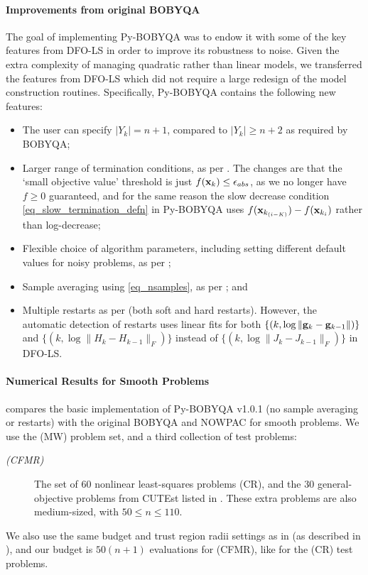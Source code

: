 \paragraph{Improvements from original BOBYQA}
The goal of implementing Py-BOBYQA was to endow it with some of the key features from DFO-LS in order to improve its robustness to noise.
Given the extra complexity of managing quadratic rather than linear models, we transferred the features from DFO-LS which did not require a large redesign of the model construction routines.
Specifically, Py-BOBYQA contains the following new features:
\begin{itemize}
	\item The user can specify $|Y_k|=n+1$, compared to $|Y_k|\geq n+2$ as required by BOBYQA;
	\item Larger range of termination conditions, as per . The changes are that the `small objective value' threshold is just $f(\mathbf{x}_k) \leq \epsilon_{abs}$, as we no longer have $f\geq 0$ guaranteed, and for the same reason the slow decrease condition \eqref{eq_slow_termination_defn} in Py-BOBYQA uses $f(\mathbf{x}_{k_{(i-K)}})-f(\mathbf{x}_{k_i})$ rather than log-decrease;
	\item Flexible choice of algorithm parameters, including setting different default values for noisy problems, as per ;
	\item Sample averaging using \eqref{eq_nsamples}, as per ; and
	\item Multiple restarts as per  (both soft and hard restarts). 
	However, the automatic detection of restarts uses linear fits for both $\{(k, \log\|\mathbf{g}_k-\mathbf{g}_{k-1}\|)\}$ and $\{(k, \log\|H_k-H_{k-1}\|_F)\}$ instead of $\{(k, \log\|J_k-J_{k-1}\|_F)\}$ in DFO-LS.
\end{itemize}

\paragraph{Numerical Results for Smooth Problems}
  compares the basic implementation of Py-BOBYQA v1.0.1 (no sample averaging or restarts) with the original BOBYQA \cite{Powell2009} and NOWPAC \cite{Augustin2014} for smooth problems. 
We use the (MW) problem set, and a third collection of test problems: 
\begin{description}
	\item[\rm \textit{(CFMR)}] The set of 60 nonlinear least-squares problems (CR), and the 30 general-objective problems from CUTEst listed in . These extra problems are also medium-sized, with $50 \leq n \leq 110$.
\end{description}
We also use the same budget and trust region radii settings as in 
(as described in ), and our budget is $50(n+1)$ evaluations for (CFMR), like for the (CR) test problems.

